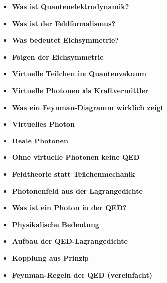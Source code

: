 \vspace{1em}
\begin{tcolorbox}[title=physikalische Boxen, physikbox]
	\begin{itemize}
		\item \textbf{Was ist Quantenelektrodynamik?} \dotfill \pageref{box:was ist quantenelektro}
		\item \textbf{Was ist der Feldformalismus?} \dotfill \pageref{box:was ist Feldformalismus}
		\item \textbf{Was bedeutet Eichsymmetrie?} \dotfill \pageref{box:was bedeutet Eichsy}
		\item \textbf{Folgen der Eichsymmetrie} \dotfill \pageref{box:folgen der Eichsy}
		\item \textbf{Virtuelle Teilchen im Quantenvakuum} \dotfill \pageref{box:virtuelle-teilchen}
		\item \textbf{Virtuelle Photonen als Kraftvermittler} \dotfill \pageref{box:Virtuelle Photonen als kraftvermittler}
		\item \textbf{Was ein Feynman-Diagramm wirklich zeigt} \dotfill \pageref{box:Was ein Feynman-Diagramm}
		\item \textbf{Virtuelles Photon} \dotfill \pageref{box:virtuelles Photon}
		\item \textbf{Reale Photonen} \dotfill \pageref{box:Reale Photonen}
		\item \textbf{Ohne virtuelle Photonen keine QED} \dotfill \pageref{box:Ohne virtuelle Photonen keine}
		\item \textbf{Feldtheorie statt Teilchenmechanik} \dotfill \pageref{box:Feldtheorie statt Teilchenmechanik}
		\item \textbf{Photonenfeld aus der Lagrangedichte} \dotfill \pageref{box:Photonenfeld aus der Lagrangedichte}
		\item \textbf{Was ist ein Photon in der QED?} \dotfill \pageref{box:Warum ist ein Photon in der QED}
		\item \textbf{Physikalische Bedeutung} \dotfill \pageref{box:physikalische Bedeutung}
	\end{itemize}
\end{tcolorbox}

\vspace{1em}

\begin{tcolorbox}[title=mathebox, mathebox]
	\begin{itemize}
		\item \textbf{Aufbau der QED-Lagrangedichte} \dotfill \pageref{box:Sufbau der QED-Langrangedichte}
		\item \textbf{Kopplung aus Prinzip} \dotfill \pageref{box:Kopplung aus Prinzip}
		\item \textbf{Feynman-Regeln der QED (vereinfacht)} \dotfill \pageref{box:Feynman-Regeln der QED}
	\end{itemize}
\end{tcolorbox}

